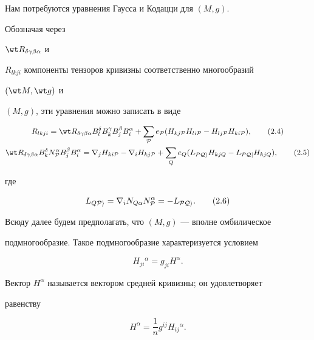 Нам потребуются уравнения Гаусса и Кодацци для $(M,g)$.


Обозначая через


$\wt R_{\delta\gamma\beta\alpha}$ и


$R_{lkji}$ компоненты тензоров кривизны соответственно многообразий


$(\wt M,\wt g)$ и


$(M,g)$, эти уравнения можно записать в виде


\begin{gather}


R_{lkji}=\wt R_{\delta\gamma\beta\alpha}B^\delta_l


B^\gamma_k B^\beta_j B^\alpha_i+\sum_{\cal P}e_{\cal P}


(H_{kj\cal P}H_{li\cal P}-H_{lj\cal P}H_{ki\cal P}),\tag{2.4} \\


\wt R_{\delta\gamma\beta\alpha}B^\delta_kN^\alpha_{\cal P}


B^\beta_j B^\alpha_i=\nabla_j H_{ki\cal P}-\nabla_i


H_{kj\cal P}+\sum_Q e_Q(L_{\cal P Qi}H_{kj Q}-


L_{\cal P Qj}H_{kj Q}),\tag{2.5}


\end{gather}


где


\begin{equation}


L_{Q\cal P i}=\nabla_iN_{Q\alpha}N^\alpha_{\cal P}=


-L_{\cal P Q i}.\tag{2.6}


\end{equation}


Всюду далее будем предполагать, что $(M,g)$ --- вполне омбилическое


подмногообразие. Такое подмногообразие характеризуется условием


\begin{equation}


H_{ji}{}^\alpha=g_{ji}H^\alpha.\tag{2.7}


\end{equation}


Вектор $H^\alpha$ называется вектором средней кривизны; он удовлетворяет


равенству


\begin{equation}


H^\alpha=\frac{1}{n}g^{ij}H_{ij}{}^\alpha.\tag{2.8}


\end{equation}


